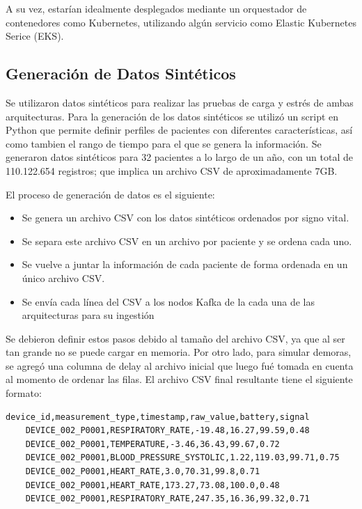 A su vez, estarían idealmente desplegados mediante un orquestador de contenedores como Kubernetes, utilizando algún servicio como Elastic Kubernetes Serice (EKS).

\newpage

\subsection{Generación de Datos Sintéticos}

Se utilizaron datos sintéticos para realizar las pruebas de carga y estrés de ambas arquitecturas.
Para la generación de los datos sintéticos se utilizó un script en Python que permite definir perfiles de pacientes con diferentes características,
así como tambien el rango de tiempo para el que se genera la información.
Se generaron datos sintéticos para 32 pacientes a lo largo de un año, con un total de 110.122.654 registros;
que implica un archivo CSV de aproximadamente 7GB.

El proceso de generación de datos es el siguiente:
\begin{itemize}
    \item Se genera un archivo CSV con los datos sintéticos ordenados por signo vital.
    \item Se separa este archivo CSV en un archivo por paciente y se ordena cada uno.
    \item Se vuelve a juntar la información de cada paciente de forma ordenada en un único archivo CSV.
    \item Se envía cada línea del CSV a los nodos Kafka de la cada una de las arquitecturas para su ingestión
\end{itemize}


Se debieron definir estos pasos debido al tamaño del archivo CSV, ya que al ser tan grande no se puede cargar en memoria.
Por otro lado, para simular demoras, se agregó una columna de delay al archivo inicial que luego fué tomada en cuenta al momento de ordenar las filas. 
El archivo CSV final resultante tiene el siguiente formato:
\begin{lstlisting}[language=CSV]
    device_id,measurement_type,timestamp,raw_value,battery,signal
    DEVICE_002_P0001,RESPIRATORY_RATE,-19.48,16.27,99.59,0.48
    DEVICE_002_P0001,TEMPERATURE,-3.46,36.43,99.67,0.72
    DEVICE_002_P0001,BLOOD_PRESSURE_SYSTOLIC,1.22,119.03,99.71,0.75
    DEVICE_002_P0001,HEART_RATE,3.0,70.31,99.8,0.71
    DEVICE_002_P0001,HEART_RATE,173.27,73.08,100.0,0.48
    DEVICE_002_P0001,RESPIRATORY_RATE,247.35,16.36,99.32,0.71
\end{lstlisting}

